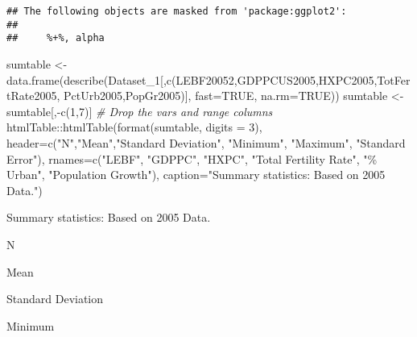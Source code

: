 \documentclass[
]{article}
\newenvironment{Shaded}{\begin{snugshade}}{\end{snugshade}}
\newcommand{\AttributeTok}[1]{\textcolor[rgb]{0.77,0.63,0.00}{#1}}
\newcommand{\CommentTok}[1]{\textcolor[rgb]{0.56,0.35,0.01}{\textit{#1}}}
\newcommand{\ConstantTok}[1]{\textcolor[rgb]{0.00,0.00,0.00}{#1}}
\newcommand{\DecValTok}[1]{\textcolor[rgb]{0.00,0.00,0.81}{#1}}
\newcommand{\FunctionTok}[1]{\textcolor[rgb]{0.00,0.00,0.00}{#1}}
\newcommand{\NormalTok}[1]{#1}
\newcommand{\OtherTok}[1]{\textcolor[rgb]{0.56,0.35,0.01}{#1}}
\newcommand{\SpecialCharTok}[1]{\textcolor[rgb]{0.00,0.00,0.00}{#1}}
\newcommand{\StringTok}[1]{\textcolor[rgb]{0.31,0.60,0.02}{#1}}
\begin{document}
\begin{verbatim}
## The following objects are masked from 'package:ggplot2':
## 
##     %+%, alpha
\end{verbatim}

\begin{Shaded}
\begin{Highlighting}[]
\NormalTok{sumtable }\OtherTok{\textless{}{-}} \FunctionTok{data.frame}\NormalTok{(}\FunctionTok{describe}\NormalTok{(Dataset\_1[,}\FunctionTok{c}\NormalTok{(}\StringTok{\textquotesingle{}LEBF20052\textquotesingle{}}\NormalTok{,}\StringTok{\textquotesingle{}GDPPCUS2005\textquotesingle{}}\NormalTok{,}\StringTok{\textquotesingle{}HXPC2005\textquotesingle{}}\NormalTok{,}\StringTok{\textquotesingle{}TotFertRate2005\textquotesingle{}}\NormalTok{,}
                                               \StringTok{\textquotesingle{}PctUrb2005\textquotesingle{}}\NormalTok{,}\StringTok{\textquotesingle{}PopGr2005\textquotesingle{}}\NormalTok{)], }
                          \AttributeTok{fast=}\ConstantTok{TRUE}\NormalTok{, }\AttributeTok{na.rm=}\ConstantTok{TRUE}\NormalTok{))}
\NormalTok{sumtable }\OtherTok{\textless{}{-}}\NormalTok{ sumtable[,}\SpecialCharTok{{-}}\FunctionTok{c}\NormalTok{(}\DecValTok{1}\NormalTok{,}\DecValTok{7}\NormalTok{)] }\CommentTok{\# Drop the vars and range columns}
\NormalTok{htmlTable}\SpecialCharTok{::}\FunctionTok{htmlTable}\NormalTok{(}\FunctionTok{format}\NormalTok{(sumtable, }\AttributeTok{digits =} \DecValTok{3}\NormalTok{),}
                     \AttributeTok{header=}\FunctionTok{c}\NormalTok{(}\StringTok{"N"}\NormalTok{,}\StringTok{"Mean"}\NormalTok{,}\StringTok{"Standard Deviation"}\NormalTok{, }\StringTok{"Minimum"}\NormalTok{, }\StringTok{"Maximum"}\NormalTok{, }\StringTok{"Standard Error"}\NormalTok{),}
                     \AttributeTok{rnames=}\FunctionTok{c}\NormalTok{(}\StringTok{"LEBF"}\NormalTok{, }\StringTok{"GDPPC"}\NormalTok{, }\StringTok{"HXPC"}\NormalTok{, }\StringTok{"Total Fertility Rate"}\NormalTok{, }\StringTok{"\% Urban"}\NormalTok{, }\StringTok{"Population Growth"}\NormalTok{),}
                     \AttributeTok{caption=}\StringTok{"Summary statistics: Based on 2005 Data."}\NormalTok{) }
\end{Highlighting}
\end{Shaded}

Summary statistics: Based on 2005 Data.

N

Mean

Standard Deviation

Minimum
\end{document}
